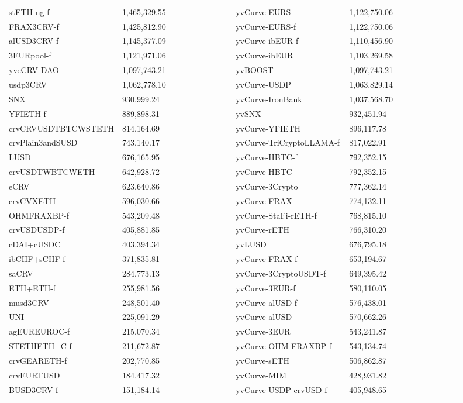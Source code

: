 \begin{longtable}{@{}p{0.25\linewidth}p{0.25\linewidth}p{0.25\linewidth}p{0.25\linewidth}@{}}
stETH-ng-f & 1,465,329.55 & yvCurve-EURS & 1,122,750.06 \\
FRAX3CRV-f & 1,425,812.90 & yvCurve-EURS-f & 1,122,750.06 \\
alUSD3CRV-f & 1,145,377.09 & yvCurve-ibEUR-f & 1,110,456.90 \\
3EURpool-f & 1,121,971.06 & yvCurve-ibEUR & 1,103,269.58 \\
yveCRV-DAO & 1,097,743.21 & yvBOOST & 1,097,743.21 \\
usdp3CRV & 1,062,778.10 & yvCurve-USDP & 1,063,829.14 \\
SNX & 930,999.24 & yvCurve-IronBank & 1,037,568.70 \\
YFIETH-f & 889,898.31 & yvSNX & 932,451.94 \\
crvCRVUSDTBTCWSTETH & 814,164.69 & yvCurve-YFIETH & 896,117.78 \\
crvPlain3andSUSD & 743,140.17 & yvCurve-TriCryptoLLAMA-f & 817,022.91 \\
LUSD & 676,165.95 & yvCurve-HBTC-f & 792,352.15 \\
crvUSDTWBTCWETH & 642,928.72 & yvCurve-HBTC & 792,352.15 \\
eCRV & 623,640.86 & yvCurve-3Crypto & 777,362.14 \\
crvCVXETH & 596,030.66 & yvCurve-FRAX & 774,132.11 \\
OHMFRAXBP-f & 543,209.48 & yvCurve-StaFi-rETH-f & 768,815.10 \\
crvUSDUSDP-f & 405,881.85 & yvCurve-rETH & 766,310.20 \\
cDAI+cUSDC & 403,394.34 & yvLUSD & 676,795.18 \\
ibCHF+sCHF-f & 371,835.81 & yvCurve-FRAX-f & 653,194.67 \\
saCRV & 284,773.13 & yvCurve-3CryptoUSDT-f & 649,395.42 \\
ETH+ETH-f & 255,981.56 & yvCurve-3EUR-f & 580,110.05 \\
musd3CRV & 248,501.40 & yvCurve-alUSD-f & 576,438.01 \\
UNI & 225,091.29 & yvCurve-alUSD & 570,662.26 \\
agEUREUROC-f & 215,070.34 & yvCurve-3EUR & 543,241.87 \\
STETHETH_C-f & 211,672.87 & yvCurve-OHM-FRAXBP-f & 543,134.74 \\
crvGEARETH-f & 202,770.85 & yvCurve-sETH & 506,862.87 \\
crvEURTUSD & 184,417.32 & yvCurve-MIM & 428,931.82 \\
BUSD3CRV-f & 151,184.14 & yvCurve-USDP-crvUSD-f & 405,948.65 \\

\end{longtable}
